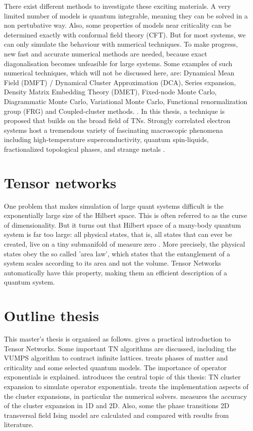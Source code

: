 There exist different methods to investigate these exciting materials. A very limited number of models is quantum integrable, meaning they can be solved in a non pertubative way. Also, some properties of models near criticality can be determined exactly with conformal field theory (CFT). But for most systems, we can only simulate the behaviour with numerical techniques. To make progress, new fast and accurate numerical methods are needed, because exact diagonalisation becomes unfeasible for large systems. Some examples of such numerical techniques, which will not be discussed here, are: Dynamical Mean Field (DMFT) / Dynamical Cluster Approximation  (DCA), Series expansion, Density Matrix Embedding Theory (DMET), Fixed-node Monte Carlo, Diagrammatic Monte Carlo, Variational Monte Carlo, Functional renormalization group (FRG) and Coupled-cluster methods. \cite{Corboz}. In this thesis, a technique is proposed that builds on the broad field of \Glspl{TN}.
Strongly correlated electron systems host a tremendous variety of fascinating macroscopic phenomena including high-temperature superconductivity, quantum spin-liquids, fractionalized topological phases, and strange metals \cite{Alexandradinata2020}.

\section{Tensor networks}

One problem that makes simulation of large quant systems difficult is the exponentially large size of the Hilbert space.  This is often referred to as the curse of dimensionality. But it turns out that Hilbert space of a many-body quantum system is far too large: all physical states, that is, all states that can ever be created, live on a tiny submanifold of measure zero \cite{Cirac}. More precisely, the physical states obey the so called 'area law', which states that the entanglement of a system scales according to its area and not the volume. Tensor Networks automatically have this property, making them an efficient description of a quantum system.


\section{Outline thesis}

This master's thesis is organised as follows.  gives a practical introduction to Tensor Networks. Some important TN algorithms are discussed, including the VUMPS algorithm to contract infinite lattices.  treats phases of matter and criticality and some selected quantum models. The importance of operator exponentials is explained.  introduces the central topic of this thesis: TN cluster expansion to simulate operator exponentials.  treats the implementation aspects of the cluster expansions, in particular the numerical solvers.  measures the accuracy of the cluster expansion in 1D and 2D. Also, some the phase transitions 2D transversal field Ising model are calculated and compared with results from literature.
